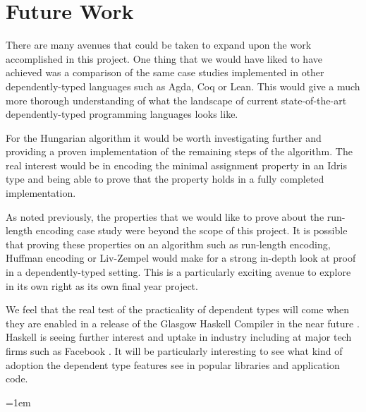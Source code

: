 \documentclass[a4paper, notitlepage]{report}
\begin{document}
\chapter{Future Work}
\label{sec:org9a51c4c}
There are many avenues that could be taken to expand upon the work accomplished
in this project. One thing that we would have liked to have achieved was a
comparison of the same case studies implemented in other dependently-typed
languages such as Agda, Coq or Lean. This would give a much more thorough
understanding of what the landscape of current state-of-the-art
dependently-typed programming languages looks like.

For the Hungarian algorithm it would be worth investigating further and
providing a proven implementation of the remaining steps of the algorithm. The
real interest would be in encoding the minimal assignment property in an Idris
type and being able to prove that the property holds in a fully completed
implementation.

As noted previously, the properties that we would like to prove about the
run-length encoding case study were beyond the scope of this project. It is
possible that proving these properties on an algorithm such as run-length
encoding, Huffman encoding or Liv-Zempel would make for a strong in-depth look
at proof in a dependently-typed setting. This is a particularly exciting avenue
to explore in its own right as its own final year project.

We feel that the real test of the practicality of dependent types will come when
they are enabled in a release of the Glasgow Haskell Compiler in the near future
\cite{eisenberg_dependent_2016,weirich_specif_2017}. Haskell is seeing further
interest and uptake in industry including at major tech firms such as Facebook
\cite{facebook_haxl}. It will be particularly interesting to see what kind of
adoption the dependent type features see in popular libraries and application
code.

\emergencystretch=1em
\printbibliography[heading=bibintoc, title=References]
\appendix
\end{document}
